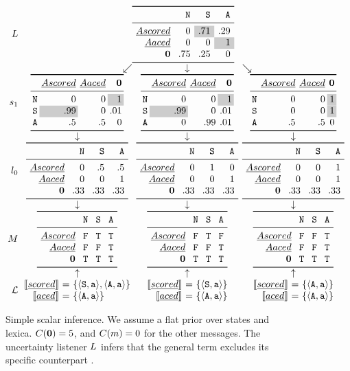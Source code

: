 \documentclass[leqno]{article}
\begin{document}
\begin{figure}[t]
  \[
  \setlength{\arraycolsep}{2pt}
  \begin{array}{r c c c}
    \UncertaintyListener &
    \multicolumn{3}{c}{\genericscalar{0}{\graycell{.71}}{.29}{0}{0}{\graycell{1}}{.75}{.25}{0}}
    \\
    & \multicolumn{1}{r}{\swarrow} & \multicolumn{1}{c}{\downarrow} & \multicolumn{1}{l}{\searrow} 
    \\
    \speakerOne
    &
    \scalarspeaker{0}{0}{\graycell{1}}{\graycell{.99}}{0}{.01}{.5}{.5}{0}
    &
    \scalarspeaker{0}{0}{\graycell{1}}{\graycell{.99}}{0}{.01}{0}{.99}{.01}
    &
    \scalarspeaker{0}{0}{\graycell{1}}{0}{0}{\graycell{1}}{.5}{.5}{0}
    \\
    & \downarrow & \downarrow & \downarrow
    \\
    \listenerZero
    &
    \genericscalar{0}{.5}{.5}{0}{0}{1}{.33}{.33}{.33}
    &
    \genericscalar{0}{1}{0}{0}{0}{1}{.33}{.33}{.33}
    &
    \genericscalar{0}{0}{1}{0}{0}{1}{.33}{.33}{.33}
    \\
    & \downarrow & \downarrow & \downarrow 
    \\    
    \Messages
    &
    \genericscalar{\False}{\True}{\True}{\False}{\False}{\True}{\True}{\True}{\True}
    &
    \genericscalar{\False}{\True}{\False}{\False}{\False}{\True}{\True}{\True}{\True}
    &
    \genericscalar{\False}{\False}{\True}{\False}{\False}{\True}{\True}{\True}{\True}
    \\
    & \uparrow & \uparrow & \uparrow 
    \\                               
    \Lex
    & 
    \scalarlex{\tuple{\world{S},\playera}, \tuple{\world{A},\playera}}
    & 
    \scalarlex{\tuple{\world{S},\playera}}
    &
    \scalarlex{\tuple{\world{A},\playera}}   
  \end{array}
  \]
  \caption{Simple scalar inference. We assume a flat prior over states
    and lexica. $C(\mathbf{0}) = 5$, and $C(m) = 0$ for
    the other messages. The uncertainty listener $L$
    infers that the general term  excludes its specific counterpart
    .}
  \label{fig:simplescalar}
\end{figure}
\end{document}
